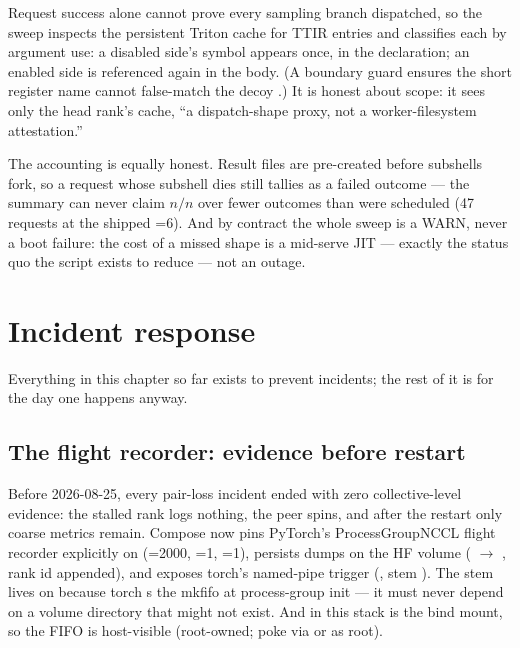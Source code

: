 Request success alone cannot prove every
sampling branch dispatched, so the sweep inspects the persistent Triton cache
for  TTIR entries and classifies each by argument
use: a disabled side's symbol appears once, in the declaration; an enabled
side is referenced again in the body. (A boundary guard ensures the short
register name  cannot false-match the decoy
.)
It is honest about scope: it sees only the
head rank's cache, ``a dispatch-shape proxy, not a worker-filesystem
attestation.''

The accounting is equally honest. Result files are pre-created
before subshells fork, so a request whose subshell dies still tallies as a
failed outcome --- the summary can never claim $n/n$ over fewer outcomes than
were scheduled (47 requests at the shipped =6). And by
contract the whole sweep is a WARN, never a boot failure: the cost of a missed
shape is a mid-serve JIT --- exactly the status quo the script exists to
reduce --- not an outage.

\section{Incident response}
\label{sec:ops-incident}

Everything in this chapter so far exists to prevent incidents; the rest of
it is for the day one happens anyway.

\subsection{The flight recorder: evidence before restart}

Before 2026-08-25, every pair-loss incident ended with zero collective-level
evidence: the stalled rank logs nothing, the peer spins, and after the restart
only coarse metrics remain. Compose now pins PyTorch's ProcessGroupNCCL flight
recorder explicitly on (=2000,
=1,
=1), persists dumps on the HF volume
( $\rightarrow$
, rank id appended),
and exposes torch's named-pipe trigger
(, stem
). The stem lives on  because torch
s the mkfifo at process-group init --- it must never depend
on a volume directory that might not exist. And in this stack 
is the  bind mount, so the FIFO is host-visible
(root-owned; poke via  or as root).

